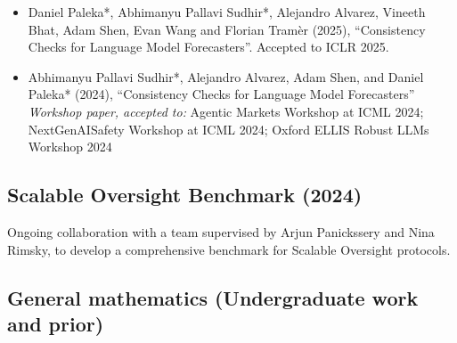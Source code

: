 \documentclass{article}
\begin{document}
\begin{itemize}
    \item Daniel Paleka*, Abhimanyu Pallavi Sudhir*, Alejandro Alvarez, Vineeth Bhat, Adam Shen, Evan Wang and Florian Tram\`er (2025), ``Consistency Checks for Language Model Forecasters''. Accepted to ICLR 2025.
    \item
          Abhimanyu Pallavi Sudhir*, Alejandro Alvarez, Adam Shen, and Daniel Paleka* (2024), ``Consistency Checks for Language Model Forecasters'' \emph{Workshop paper, accepted to:} Agentic Markets Workshop at ICML 2024; NextGenAISafety Workshop at ICML 2024; Oxford ELLIS Robust LLMs Workshop 2024
\end{itemize}

\subsection*{Scalable Oversight Benchmark (2024)}

Ongoing collaboration with a team supervised by Arjun Panickssery and Nina Rimsky, to develop a comprehensive benchmark for Scalable Oversight protocols.

\subsection*{General mathematics (Undergraduate work and prior)}

\end{document}

